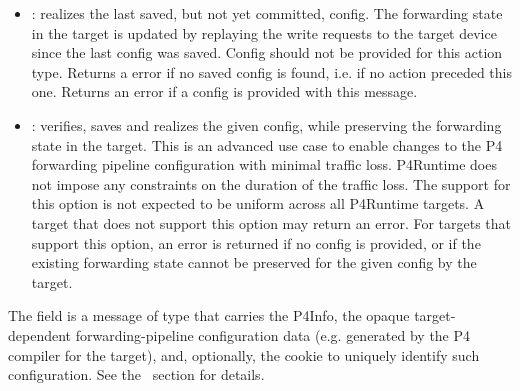 \documentclass[11pt]{article}
\begin{document}
{\begin{itemize}
\item{}
: realizes the last saved, but not yet committed, config. The
forwarding state in the target is updated by replaying the write requests to
the target device since the last config was saved. Config should not be
provided for this action type. Returns a  error if no saved config
is found, i.e. if no  action preceded this one. Returns an
 error if a config is provided with this message.%

\item{}
: verifies, saves and realizes the given config, while
preserving the forwarding state in the target. This is an advanced use case to
enable changes to the P4 forwarding pipeline configuration with minimal
traffic loss. P4Runtime does not impose any constraints on the duration of the
traffic loss. The support for this option is not expected to be uniform across
all P4Runtime targets. A target that does not support this option may return
an  error. For targets that support this option, an
 error is returned if no config is provided, or if the
existing forwarding state cannot be preserved for the given config by the
target.%
\end{itemize}%

\noindent{}The  field is a message of type  that carries
the P4Info, the opaque target-dependent forwarding-pipeline configuration data
(e.g. generated by the P4 compiler for the target), and, optionally, the cookie
to uniquely identify such configuration. See the~ section for details.%

}
\end{document}
